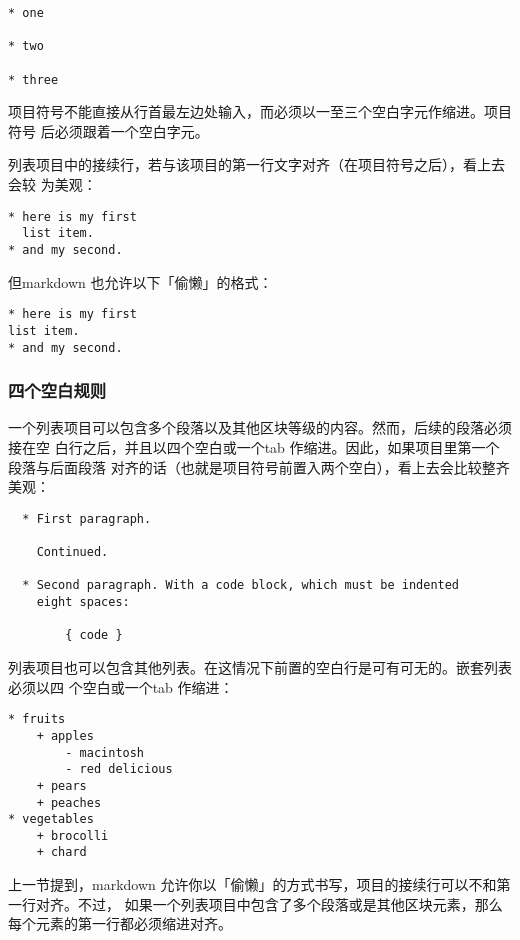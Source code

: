 \documentclass[fancyhdr,bookmark]{ctexbook}
\begin{document}
\begin{lstlisting}
* one

* two

* three
\end{lstlisting}

项目符号不能直接从行首最左边处输入，而必须以一至三个空白字元作缩进。项目符号
后必须跟着一个空白字元。

列表项目中的接续行，若与该项目的第一行文字对齐（在项目符号之后），看上去会较
为美观：

\begin{lstlisting}
* here is my first
  list item.
* and my second.
\end{lstlisting}

但markdown 也允许以下「偷懒」的格式：

\begin{lstlisting}
* here is my first
list item.
* and my second.
\end{lstlisting}

\subsubsection{四个空白规则}\label{ux56dbux4e2aux7a7aux767dux89c4ux5219}

一个列表项目可以包含多个段落以及其他区块等级的内容。然而，后续的段落必须接在空
白行之后，并且以四个空白或一个tab
作缩进。因此，如果项目里第一个段落与后面段落
对齐的话（也就是项目符号前置入两个空白），看上去会比较整齐美观：

\begin{lstlisting}
  * First paragraph.

    Continued.

  * Second paragraph. With a code block, which must be indented
    eight spaces:

        { code }
\end{lstlisting}

列表项目也可以包含其他列表。在这情况下前置的空白行是可有可无的。嵌套列表必须以四
个空白或一个tab 作缩进：

\begin{lstlisting}
* fruits
    + apples
        - macintosh
        - red delicious
    + pears
    + peaches
* vegetables
    + brocolli
    + chard
\end{lstlisting}

上一节提到，markdown
允许你以「偷懒」的方式书写，项目的接续行可以不和第一行对齐。不过，
如果一个列表项目中包含了多个段落或是其他区块元素，那么每个元素的第一行都必须缩进对齐。
\end{document}
